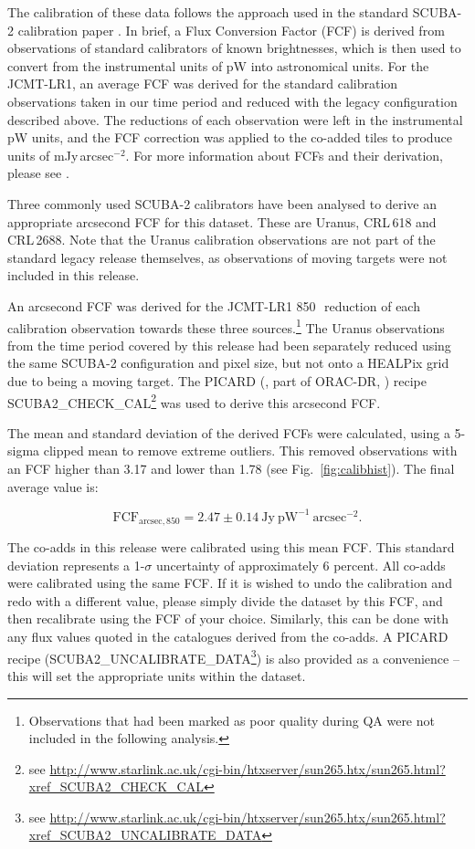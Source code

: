\documentclass[twocolumn]{aastex6}
\newcommand{\ascl}[1]{\href{http://www.ascl.net/#1}{ascl:#1}}
\begin{document}
The calibration of these data follows the approach used in the
standard SCUBA-2 calibration paper \citep{Dempsey2013}. In brief, a
Flux Conversion Factor (FCF) is derived from observations of standard
calibrators of known brightnesses, which is then used to convert from
the instrumental units of pW into astronomical units. For the
JCMT-LR1, an average FCF was derived for the standard calibration
observations taken in our time period and reduced with the legacy
configuration described above.  The reductions of each observation
were left in the instrumental pW units, and the FCF correction was
applied to the co-added tiles to produce units of
mJy\,arcsec$^{-2}$. For more information about FCFs and their
derivation, please see \citet{Dempsey2013}.

Three commonly used SCUBA-2 calibrators have been analysed to derive
an appropriate arcsecond FCF for this dataset. These are Uranus,
CRL\,618 and CRL\,2688. Note that the Uranus calibration observations
are not part of the standard legacy release themselves, as
observations of moving targets were not included in this release.

An arcsecond FCF was derived for the JCMT-LR1 850\,\micron\ reduction
of each calibration observation towards these three
sources.\footnote{Observations that had been marked as poor quality
  during QA were not included in the following analysis.}  The Uranus
observations from the time period covered by this release had been
separately reduced using the same SCUBA-2 configuration and pixel
size, but not onto a HEALPix grid due to being a moving target. The
PICARD (\citealp{SUN265}, part of ORAC-DR, \citealp[][\ascl{1310.001}]{SUN230})
recipe SCUBA2\_CHECK\_CAL\footnote{see
  \url{http://www.starlink.ac.uk/cgi-bin/htxserver/sun265.htx/sun265.html?xref_SCUBA2_CHECK_CAL}}
was used to derive this arcsecond FCF.

The mean and standard deviation of the derived FCFs were calculated,
using a 5-sigma clipped mean to remove extreme outliers. This removed
observations with an FCF higher than 3.17 and lower than 1.78 (see
Fig.~\ref{fig:calibhist}). The final average value is:

\begin{equation}
\mathrm{FCF}_{\mathrm{arcsec},850} = 2.47 \pm 0.14\ \mathrm{Jy}\ \mathrm{pW}^{-1}\  \mathrm{arcsec}^{-2}.
\end{equation}

The co-adds in this release were calibrated using this mean FCF.  This
standard deviation represents a 1-$\sigma$ uncertainty of
approximately 6 percent. All co-adds were calibrated using the same
FCF. If it is wished to undo the calibration and redo with a different
value, please simply divide the dataset by this FCF, and then
recalibrate using the FCF of your choice. Similarly, this can be done
with any flux values quoted in the catalogues derived from the
co-adds. A PICARD recipe (SCUBA2\_UNCALIBRATE\_DATA\footnote{see
  \url{http://www.starlink.ac.uk/cgi-bin/htxserver/sun265.htx/sun265.html?xref_SCUBA2_UNCALIBRATE_DATA}})
is also provided as a convenience -- this will set the appropriate
units within the dataset.
\end{document}
